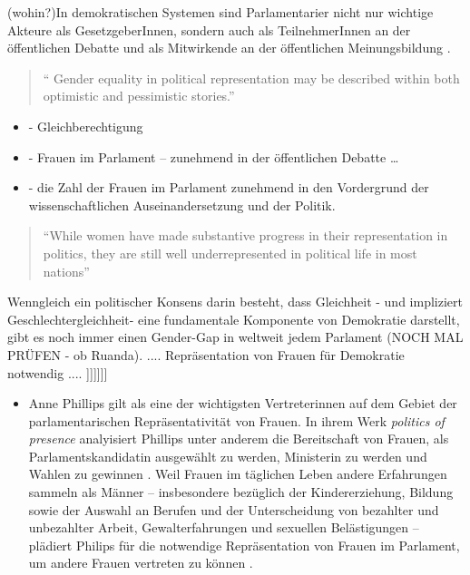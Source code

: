 \documentclass[12pt, 
    twoside=false, 
    bibliography=totoc, 
    numbers=endperiod, 
    headings=normal, 
    toc=chapterentrydotfill
    ]{scrbook}
\begin{document}
(wohin?)In demokratischen Systemen sind Parlamentarier nicht nur wichtige Akteure als GesetzgeberInnen, sondern auch als TeilnehmerInnen an der öffentlichen Debatte und als Mitwirkende an der öffentlichen Meinungsbildung  \parencite[188]{dahlerup_2018}. 


\begin{quote}
\enquote{
Gender equality in political representation may be described within both optimistic
and pessimistic stories.} \parencite[149]{celis_2018}
\end{quote}
\begin{itemize}

In Anbetracht des Zitates von \textcite{celis_2018} und einer zunehmenden deskriptiven Repräsentation von Frauen in den Parlamenten ist es essentiell, es nicht ausschließlich bei dieses Form der Repräsentation zu belassen und sich optimistisch damit zufrieden zu geben, sondern die Forderung nach 'gender equality', auch im Sinne gleicher und gleichwertiger Repräsentation auf allen fünf Ebenen, zu fördern. (ggf. umschreibebedürftig?!) 

[[[]
\item - Gleichberechtigung
\item -  Frauen im Parlament – zunehmend in der öffentlichen Debatte … 
\item -  die Zahl der Frauen im Parlament zunehmend in den Vordergrund der wissenschaftlichen Auseinandersetzung und der Politik. 
\end{itemize}

\begin{quote}
    \enquote{While women have made substantive progress in their representation in politics, they are still well underrepresented in political life in most nations} \parencite[2]{coffe_2013}
\end{quote}

Wenngleich ein politischer Konsens darin besteht, dass Gleichheit - und impliziert Geschlechtergleichheit- eine fundamentale Komponente von Demokratie darstellt, gibt es noch immer einen Gender-Gap in weltweit jedem Parlament (NOCH MAL PRÜFEN - ob Ruanda).  .... Repräsentation von Frauen für Demokratie notwendig .... 
]]]]]]

\begin{itemize}
\item Anne Phillips gilt als eine der wichtigsten Vertreterinnen auf dem Gebiet der parlamentarischen Repräsentativität von Frauen. In ihrem Werk \emph{politics of presence} \parencite*{phillips_1998} analyisiert Phillips unter anderem die Bereitschaft von Frauen, als Parlamentskandidatin ausgewählt zu werden, Ministerin zu werden und Wahlen zu gewinnen \parencite[vgl.][416f.]{blaxill_2016}. 
Weil Frauen im täglichen Leben andere Erfahrungen sammeln als Männer -- insbesondere bezüglich der Kindererziehung, Bildung sowie der Auswahl an Berufen und der Unterscheidung von bezahlter und unbezahlter Arbeit, Gewalterfahrungen und sexuellen Belästigungen -- plädiert Philips für die notwendige Repräsentation von Frauen im Parlament, um andere Frauen vertreten zu können \parencite[vgl.][52]{wangnerud_2009}.
\end{itemize}
\end{document}
